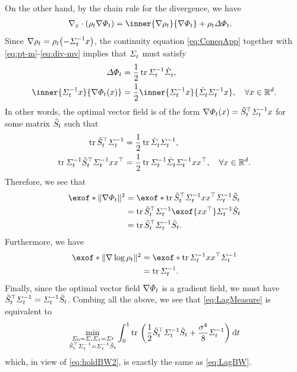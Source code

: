 On the other hand, by the chain rule for the divergence, we have
\begin{align}
\label{eq:div-mv}
\Div(\measure \vecsol)  &=   \inner{\nabla\measure}{\vecsol}  + \measure \Laplace\potsol.
\end{align}
Since $\nabla \measure = \measure \parens*{ -\Sigmasolinv\point }$, the continuity equation \eqref{eq:ConeqApp} together with \eqref{eq:pt-m}-\eqref{eq:div-mv} implies that $\Sigma^{}_{ t }$ must satisfy
\begin{align}
\Laplace\potsol &= \frac{1}{2} \tr \Sigmasolinv \dSigmasol, \\
\inner{\Sigmasolinv\point}{\vecsol(\point)}  &= \frac{1}{2} \inner{\Sigmasolinv\point}{\dSigmasol\Sigmasolinv\point}, \quad \forall \point \in \R^\vdim.
\end{align}
In other words, the optimal vector field is of the form $\nabla\Phi_{t}(x) = \tilde{S}_{t}^\top\Sigma^{-1}_{ t }x$ for some matrix $\tilde{S}_{t}$ such that 
\begin{align}
\operatorname{tr}\tilde{S}_{t}^\top \Sigma^{-1}_{ t } &= \frac{1}{2}\operatorname{tr}\dot{\Sigma}^{}_{ t }\Sigma^{-1}_{ t }, \\
\operatorname{tr} \Sigma^{-1}_{ t } \tilde{S}_{t}^\top\Sigma^{-1}_{ t } xx^\top &=\frac{1}{2} \operatorname{tr} \Sigma^{-1}_{ t } \dot{\Sigma}^{}_{ t } \Sigma^{-1}_{ t } xx^\top, \quad \forall x\in\mathbb{R}^d.
\end{align}
Therefore, we see that
\begin{align}
\nn
\exof*{\norm{\vecsol}^2} &= \exof*{\tr \Ht^\top\Sigmasolinv\point \point^\top\Sigmasolinv \Ht} \\
\nn
&= \tr \Ht^\top\Sigmasolinv \exof{\point\point^\top} \Sigmasolinv \Ht \\
&= \tr \Ht^\top\Sigmasolinv \Ht.
\end{align}
Furthermore, we have
\begin{align}
\nn
\exof*{ \norm{\nabla \log \measure}^2} &= \exof*{\tr \Sigmasolinv \point\point^\top \Sigmasolinv } \\
&= \tr \Sigmasolinv.
\end{align}
Finally, since the optimal vector field $\nabla\Phi_{t}$ is a gradient field, we must have $\tilde{S}_{t}^\top \Sigma^{-1}_{ t } = \Sigma^{-1}_{ t }\tilde{S}_{t}$. Combing all the above, we see that \eqref{eq:LagMeasure} is equivalent to
\begin{align}
\label{eq:LagMeasureEquiv}
\min_{\ssstyle\substack{{\Sigcurve[0] = \Sigma, \Sigcurve[\horizon] = \Sigma\prime} \\ { \Ht^\top\Sigcurveinv =  \Sigcurveinv\Ht }}} \int_{0}^\horizon  \tr\ \parens*{\frac{1}{2}\Ht^\top\Sigcurveinv \Ht  + \frac{\sdev^4}{8} \Sigcurveinv} \dt
\end{align}which, in view of \eqref{eq:holdBW2}, is exactly the same as \eqref{eq:LagBW}.



